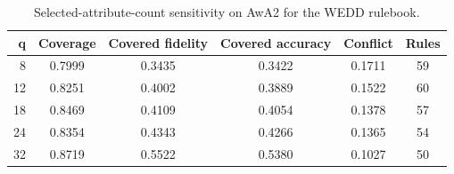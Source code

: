 \begin{table}[H]
\caption{Selected-attribute-count sensitivity on AwA2 for the WEDD rulebook.\label{tab:q_sensitivity}}
\centering
\small
\begin{tabular}{rccccc}
\toprule
q & Coverage & Covered fidelity & Covered accuracy & Conflict & Rules \\
\midrule
8 & 0.7999 & 0.3435 & 0.3422 & 0.1711 & 59 \\
12 & 0.8251 & 0.4002 & 0.3889 & 0.1522 & 60 \\
18 & 0.8469 & 0.4109 & 0.4054 & 0.1378 & 57 \\
24 & 0.8354 & 0.4343 & 0.4266 & 0.1365 & 54 \\
32 & 0.8719 & 0.5522 & 0.5380 & 0.1027 & 50 \\
\bottomrule
\end{tabular}
\end{table}
